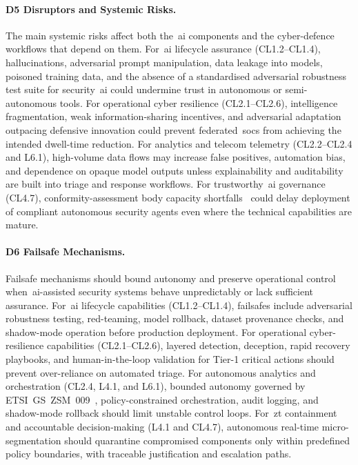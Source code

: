 \documentclass{ieeeaccess}
\begin{document}
\paragraph{D5 Disruptors and Systemic Risks.}
The main systemic risks affect both the~\gls{ai} components and the cyber-defence workflows that depend on them. For~\gls{ai} lifecycle assurance (CL1.2--CL1.4), hallucinations, adversarial prompt manipulation, data leakage into models, poisoned training data, and the absence of a standardised adversarial robustness test suite for security~\gls{ai} could undermine trust in autonomous or semi-autonomous tools. For operational cyber resilience (CL2.1--CL2.6), intelligence fragmentation, weak information-sharing incentives, and adversarial adaptation outpacing defensive innovation could prevent federated~\glspl{soc} from achieving the intended dwell-time reduction. For analytics and telecom telemetry (CL2.2--CL2.4 and L6.1), high-volume data flows may increase false positives, automation bias, and dependence on opaque model outputs unless explainability and auditability are built into triage and response workflows. For trustworthy~\gls{ai} governance (CL4.7), conformity-assessment body capacity shortfalls~\cite{ep2026aiact} could delay deployment of compliant autonomous security agents even where the technical capabilities are mature.

\paragraph{D6 Failsafe Mechanisms.}
Failsafe mechanisms should bound autonomy and preserve operational control when~\gls{ai}-assisted security systems behave unpredictably or lack sufficient assurance. For~\gls{ai} lifecycle capabilities (CL1.2--CL1.4), failsafes include adversarial robustness testing, red-teaming, model rollback, dataset provenance checks, and shadow-mode operation before production deployment. For operational cyber-resilience capabilities (CL2.1--CL2.6), layered detection, deception, rapid recovery playbooks, and human-in-the-loop validation for Tier-1 critical actions should prevent over-reliance on automated triage. For autonomous analytics and orchestration (CL2.4, L4.1, and L6.1), bounded autonomy governed by ETSI~GS~ZSM~009~\cite{etsizsm}, policy-constrained orchestration, audit logging, and shadow-mode rollback should limit unstable control loops. For~\gls{zt} containment and accountable decision-making (L4.1 and CL4.7), autonomous real-time micro-segmentation should quarantine compromised components only within predefined policy boundaries, with traceable justification and escalation paths.
\end{document}
